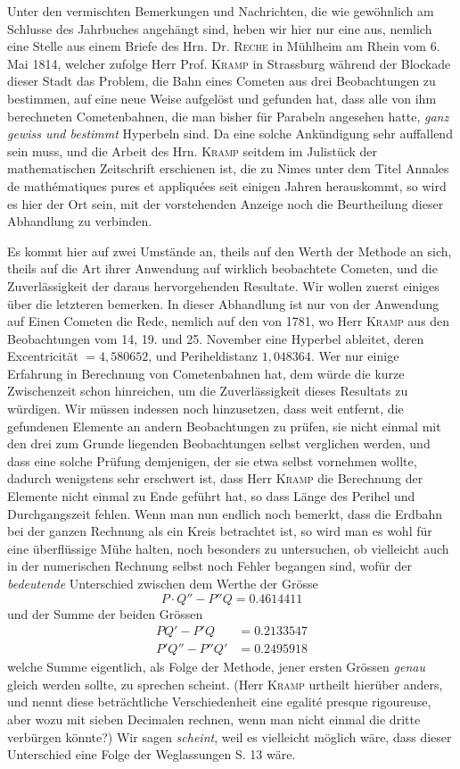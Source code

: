Unter den vermischten Bemerkungen und Nachrichten, die wie gewöhnlich am Schlusse des Jahrbuches angehängt
sind, heben wir hier nur eine aus, nemlich eine Stelle aus einem Briefe des Hrn. Dr. \textsc{Reche} in Mühlheim
am Rhein vom 6. Mai 1814, welcher zufolge Herr Prof. \textsc{Kramp} in Strassburg während der Blockade dieser
Stadt das Problem, die Bahn eines Cometen aus drei Beobachtungen zu bestimmen, auf eine neue Weise aufgelöst
und gefunden hat, dass alle von ihm berechneten Cometenbahnen, die man bisher für Parabeln angesehen hatte,
\emph{ganz gewiss und bestimmt} Hyperbeln sind. Da eine solche Ankündigung sehr auffallend sein muss, und die
Arbeit des Hrn. \textsc{Kramp} seitdem im Julistück der mathematischen Zeitschrift erschienen ist, die zu Nimes
unter dem Titel Annales de mathématiques pures et appliquées seit einigen Jahren herauskommt, so wird es
hier der Ort sein, mit der vorstehenden Anzeige noch die Beurtheilung dieser Abhandlung zu verbinden.

Es kommt hier auf zwei Umstände an, theils auf den Werth der Methode an sich, theils auf die Art ihrer
Anwendung auf wirklich beobachtete Cometen, und die Zuverlässigkeit der daraus hervorgehenden Resultate.
Wir wollen zuerst einiges über die letzteren bemerken. In dieser Abhandlung ist nur von der Anwendung auf
Einen Cometen die Rede, nemlich auf den von 1781, wo Herr \textsc{Kramp} aus den Beobachtungen vom 14, 19. und
25. November eine Hyperbel ableitet, deren Excentricität $= 4,580652$, und Periheldistanz $1,048364$. Wer
nur einige Erfahrung in Berechnung von Cometenbahnen hat, dem würde die kurze Zwischenzeit schon hinreichen,
um die Zuverlässigkeit dieses Resultats zu würdigen. Wir müssen indessen noch hinzusetzen, dass weit
entfernt, die gefundenen Elemente an andern Beobachtungen zu prüfen, sie nicht einmal mit den drei zum
Grunde liegenden Beobachtungen selbst verglichen werden, und dass eine solche Prüfung demjenigen, der sie
etwa selbst vornehmen wollte, dadurch wenigstens sehr erschwert ist, dass Herr \textsc{Kramp} die Berechnung
der Elemente nicht einmal zu
Ende geführt hat, so dass Länge des Perihel und Durchgangszeit fehlen. Wenn man nun endlich noch bemerkt,
dass die Erdbahn bei der ganzen Rechnung als ein Kreis betrachtet ist, so wird man es wohl für eine
überflüssige Mühe halten, noch besonders zu untersuchen, ob vielleicht auch in der numerischen
Rechnung selbst noch Fehler begangen sind, wofür der \emph{bedeutende} Unterschied zwischen dem Werthe der
Grösse
\[
P\!\cdot\!Q'' - P''Q = 0.4614411
\]
und der Summe der beiden Grössen
\[
\begin{aligned}
PQ' - P'Q &= 0.2133547\\
P'Q'' - P''Q' &= 0.2495918
\end{aligned}
\]
welche Summe eigentlich, als Folge der Methode, jener ersten Grössen \emph{genau} gleich werden sollte, zu
sprechen scheint. (Herr \textsc{Kramp} urtheilt hierüber anders, und nennt diese beträchtliche Verschiedenheit
eine egalité presque rigoureuse, aber wozu mit sieben Decimalen rechnen, wenn man nicht einmal die dritte
verbürgen könnte?) Wir sagen \emph{scheint}, weil es vielleicht möglich wäre, dass dieser Unterschied
eine Folge der Weglassungen S. 13 wäre.

